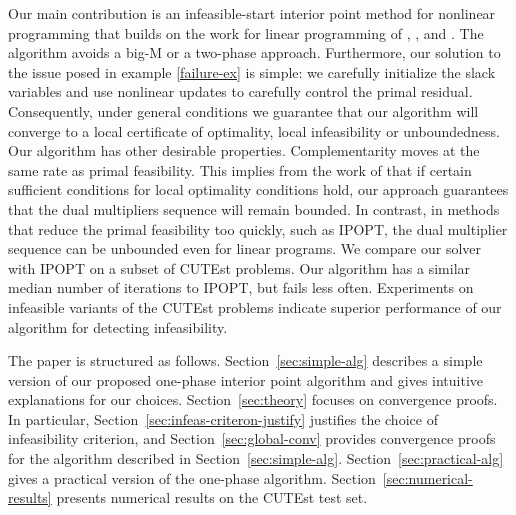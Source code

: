 \documentclass{article}
\begin{document}
Our main contribution is an infeasible-start interior point method for nonlinear programming that builds on the work for linear programming of \citet{lustig1990feasibility}, \citet{mehrotra1992implementation}, and \citet*{mizuno1993adaptive}. The algorithm avoids a big-M or a two-phase approach. Furthermore, our solution to the issue posed in example \eqref{failure-ex} is simple: we carefully initialize the slack variables and use nonlinear updates to carefully control the primal residual. Consequently, under general conditions we guarantee that our algorithm will converge to a local certificate of optimality, local infeasibility or unboundedness. Our algorithm has other desirable properties. Complementarity moves at the same rate as primal feasibility. This implies from the work of \citet*{haeser2017behavior} that if certain sufficient conditions for local optimality conditions hold, our approach guarantees that the dual multipliers sequence will remain bounded. In contrast, in methods that reduce the primal feasibility too quickly, such as IPOPT,  the dual multiplier sequence can be unbounded even for linear programs. We compare our solver with IPOPT on a subset of CUTEst problems. Our algorithm has a similar median number of iterations to IPOPT, but fails less often. Experiments on infeasible variants of the CUTEst problems indicate superior performance of our algorithm for detecting infeasibility.

The paper is structured as follows. Section~\ref{sec:simple-alg} describes a simple version of our proposed one-phase interior point algorithm and gives intuitive explanations for our choices. Section~\ref{sec:theory} focuses on convergence proofs. In particular, Section~\ref{sec:infeas-criteron-justify} justifies the choice of infeasibility criterion, and Section~\ref{sec:global-conv} provides convergence proofs for the algorithm described in Section~\ref{sec:simple-alg}. Section~\ref{sec:practical-alg} gives a practical version of the one-phase algorithm. Section~\ref{sec:numerical-results} presents numerical results on the CUTEst test set.
\end{document}
